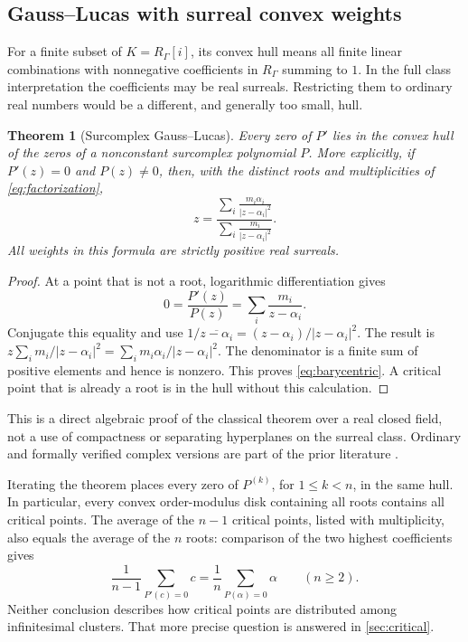 \documentclass[11pt,letterpaper]{article}
\numberwithin{equation}{section}
\newtheorem{theorem}{Theorem}[section]
\theoremstyle{definition}
\theoremstyle{remark}
\begin{document}
\subsection{Gauss--Lucas with surreal convex weights}
For a finite subset of $K=R_\Gamma[i]$, its convex hull means all finite
linear combinations with nonnegative coefficients in $R_\Gamma$ summing
to $1$. In the full class interpretation the coefficients may be real
surreals. Restricting them to ordinary real numbers would be a different,
and generally too small, hull.

\begin{theorem}[Surcomplex Gauss--Lucas]\label{thm:gausslucas}
Every zero of $P'$ lies in the convex hull of the zeros of a nonconstant
surcomplex polynomial $P$. More explicitly, if $P'(z)=0$ and $P(z)\ne0$,
then, with the distinct roots and multiplicities of \eqref{eq:factorization},
\begin{equation}\label{eq:barycentric}
 z=\frac{\displaystyle\sum_i
        \frac{m_i\alpha_i}{|z-\alpha_i|^2}}
       {\displaystyle\sum_i\frac{m_i}{|z-\alpha_i|^2}}.
\end{equation}
All weights in this formula are strictly positive real surreals.
\end{theorem}
\begin{proof}
At a point that is not a root, logarithmic differentiation gives
\[
 0=\frac{P'(z)}{P(z)}=\sum_i\frac{m_i}{z-\alpha_i}.
\]
Conjugate this equality and use
$1/\overline{z-\alpha_i}=(z-\alpha_i)/|z-\alpha_i|^2$.
The result is
$z\sum_i m_i/|z-\alpha_i|^2=\sum_i m_i\alpha_i/|z-\alpha_i|^2$.
The denominator is a finite sum of positive elements and hence is nonzero.
This proves \eqref{eq:barycentric}. A critical point that is already a
root is in the hull without this calculation.
\end{proof}

This is a direct algebraic proof of the classical theorem over a real
closed field, not a use of compactness or separating hyperplanes on the
surreal class. Ordinary and formally verified complex versions are part
of the prior literature \cite{Eberl}.

Iterating the theorem places every zero of $P^{(k)}$, for $1\le k<n$, in
the same hull. In particular, every convex order-modulus disk containing
all roots contains all critical points. The average of the $n-1$
critical points, listed with multiplicity, also equals the average of the
$n$ roots: comparison of the two highest coefficients gives
\[
 \frac1{n-1}\sum_{P'(c)=0}c=\frac1n\sum_{P(\alpha)=0}\alpha
 \qquad(n\ge2).
\]
Neither conclusion describes how critical points are distributed among
infinitesimal clusters. That more precise question is answered in
\cref{sec:critical}.
\end{document}

